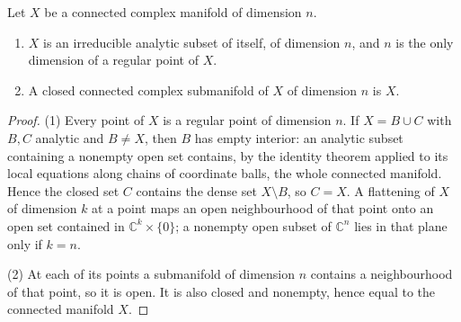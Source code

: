 \begin{proposition}
\label{ana:manifold-irreducible}
\mixedleanok
Let \(X\) be a connected complex manifold of dimension \(n\).
\begin{enumerate}
\item \(X\) is an irreducible analytic subset of itself, of dimension \(n\), and
      \(n\) is the only dimension of a regular point of \(X\).
\item A closed connected complex submanifold of \(X\) of dimension \(n\) is \(X\).
\end{enumerate}
\end{proposition}
\begin{proof}
\mixedleanok
(1) Every point of \(X\) is a regular point of dimension \(n\). If
\(X=B\cup C\) with \(B,C\) analytic and \(B\ne X\), then \(B\) has empty
interior: an analytic subset containing a nonempty open set contains, by the
identity theorem applied to its local equations along chains of coordinate balls,
the whole connected manifold. Hence the closed set \(C\) contains the dense set
\(X\setminus B\), so \(C=X\). A flattening of \(X\) of dimension \(k\) at a point
maps an open neighbourhood of that point onto an open set contained in
\(\mathbb C^k\times\{0\}\); a nonempty open subset of \(\mathbb C^n\) lies in that
plane only if \(k=n\).

(2) At each of its points a submanifold of dimension \(n\) contains a
neighbourhood of that point, so it is open. It is also closed and nonempty, hence
equal to the connected manifold \(X\).
\end{proof}
